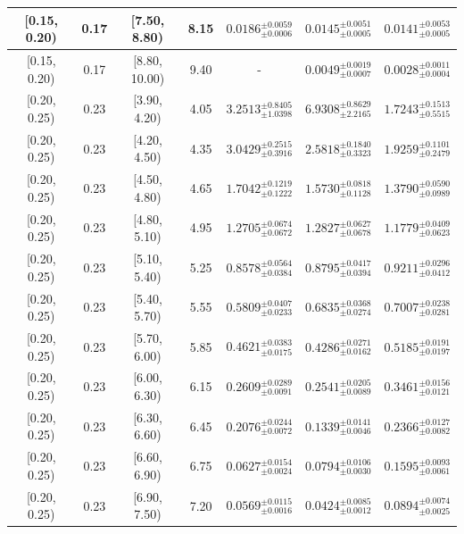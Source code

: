 \begin{longtable}{|c|c|c|c|c|c|c|}
\hline
[0.15, 0.20) & 0.17 & [7.50, 8.80) & 8.15 & $0.0186^{ \pm 0.0059 }_{ \pm 0.0006 }$ & $0.0145^{ \pm 0.0051 }_{ \pm 0.0005 }$ & $0.0141^{ \pm 0.0053 }_{ \pm 0.0005 }$ \\ 
\hline
[0.15, 0.20) & 0.17 & [8.80, 10.00) & 9.40 & - & $0.0049^{ \pm 0.0019 }_{ \pm 0.0007 }$ & $0.0028^{ \pm 0.0011 }_{ \pm 0.0004 }$ \\ 
\hline
[0.20, 0.25) & 0.23 & [3.90, 4.20) & 4.05 & $3.2513^{ \pm 0.8405 }_{ \pm 1.0398 }$ & $6.9308^{ \pm 0.8629 }_{ \pm 2.2165 }$ & $1.7243^{ \pm 0.1513 }_{ \pm 0.5515 }$ \\ 
\hline
[0.20, 0.25) & 0.23 & [4.20, 4.50) & 4.35 & $3.0429^{ \pm 0.2515 }_{ \pm 0.3916 }$ & $2.5818^{ \pm 0.1840 }_{ \pm 0.3323 }$ & $1.9259^{ \pm 0.1101 }_{ \pm 0.2479 }$ \\ 
\hline
[0.20, 0.25) & 0.23 & [4.50, 4.80) & 4.65 & $1.7042^{ \pm 0.1219 }_{ \pm 0.1222 }$ & $1.5730^{ \pm 0.0818 }_{ \pm 0.1128 }$ & $1.3790^{ \pm 0.0590 }_{ \pm 0.0989 }$ \\ 
\hline
[0.20, 0.25) & 0.23 & [4.80, 5.10) & 4.95 & $1.2705^{ \pm 0.0674 }_{ \pm 0.0672 }$ & $1.2827^{ \pm 0.0627 }_{ \pm 0.0678 }$ & $1.1779^{ \pm 0.0409 }_{ \pm 0.0623 }$ \\ 
\hline
[0.20, 0.25) & 0.23 & [5.10, 5.40) & 5.25 & $0.8578^{ \pm 0.0564 }_{ \pm 0.0384 }$ & $0.8795^{ \pm 0.0417 }_{ \pm 0.0394 }$ & $0.9211^{ \pm 0.0296 }_{ \pm 0.0412 }$ \\ 
\hline
[0.20, 0.25) & 0.23 & [5.40, 5.70) & 5.55 & $0.5809^{ \pm 0.0407 }_{ \pm 0.0233 }$ & $0.6835^{ \pm 0.0368 }_{ \pm 0.0274 }$ & $0.7007^{ \pm 0.0238 }_{ \pm 0.0281 }$ \\ 
\hline
[0.20, 0.25) & 0.23 & [5.70, 6.00) & 5.85 & $0.4621^{ \pm 0.0383 }_{ \pm 0.0175 }$ & $0.4286^{ \pm 0.0271 }_{ \pm 0.0162 }$ & $0.5185^{ \pm 0.0191 }_{ \pm 0.0197 }$ \\ 
\hline
[0.20, 0.25) & 0.23 & [6.00, 6.30) & 6.15 & $0.2609^{ \pm 0.0289 }_{ \pm 0.0091 }$ & $0.2541^{ \pm 0.0205 }_{ \pm 0.0089 }$ & $0.3461^{ \pm 0.0156 }_{ \pm 0.0121 }$ \\ 
\hline
[0.20, 0.25) & 0.23 & [6.30, 6.60) & 6.45 & $0.2076^{ \pm 0.0244 }_{ \pm 0.0072 }$ & $0.1339^{ \pm 0.0141 }_{ \pm 0.0046 }$ & $0.2366^{ \pm 0.0127 }_{ \pm 0.0082 }$ \\ 
\hline
[0.20, 0.25) & 0.23 & [6.60, 6.90) & 6.75 & $0.0627^{ \pm 0.0154 }_{ \pm 0.0024 }$ & $0.0794^{ \pm 0.0106 }_{ \pm 0.0030 }$ & $0.1595^{ \pm 0.0093 }_{ \pm 0.0061 }$ \\ 
\hline
[0.20, 0.25) & 0.23 & [6.90, 7.50) & 7.20 & $0.0569^{ \pm 0.0115 }_{ \pm 0.0016 }$ & $0.0424^{ \pm 0.0085 }_{ \pm 0.0012 }$ & $0.0894^{ \pm 0.0074 }_{ \pm 0.0025 }$ \\ 

\end{longtable}
